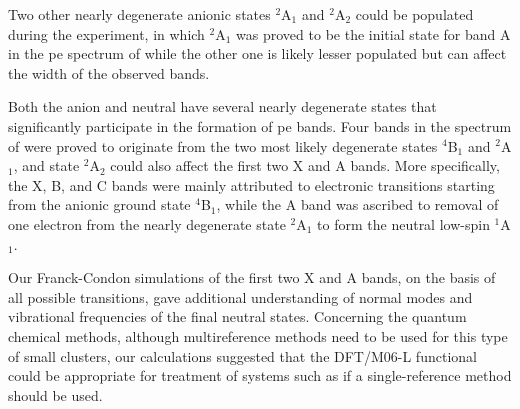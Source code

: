 \begin{refsection}
Two other nearly degenerate anionic states $^2$A$_1$ and $^2$A$_2$ could be populated during the experiment, in which $^2$A$_1$ was proved to be the initial state for band A in the \acrshort{pe} spectrum of  while the other one is likely lesser populated but can affect the width of the observed bands.



Both the anion and neutral have several nearly degenerate states that significantly participate in the formation of \acrshort{pe} bands. Four bands in the spectrum of  were proved to originate from the two most likely degenerate states $^4$B$_1$ and $^2$A$_1$, and state $^2$A$_2$ could also affect the first two X and A bands. More specifically, the X, B, and C bands were mainly attributed to electronic transitions starting from the anionic ground state $^4$B$_1$, while the A band was ascribed to removal of one electron from the nearly degenerate state $^2$A$_1$ to form the neutral low-spin $^1$A$_1$.



Our Franck-Condon simulations of the first two X and A bands, on the basis of all possible transitions, gave additional understanding of normal modes and vibrational frequencies of the final neutral states. Concerning the quantum chemical methods, although multireference methods need to be used for this type of small clusters, our calculations suggested that the DFT/M06-L functional could be appropriate for treatment of systems such as  if a single-reference method should be used.









\printbibliography[heading=subbibliography] %

\end{refsection}